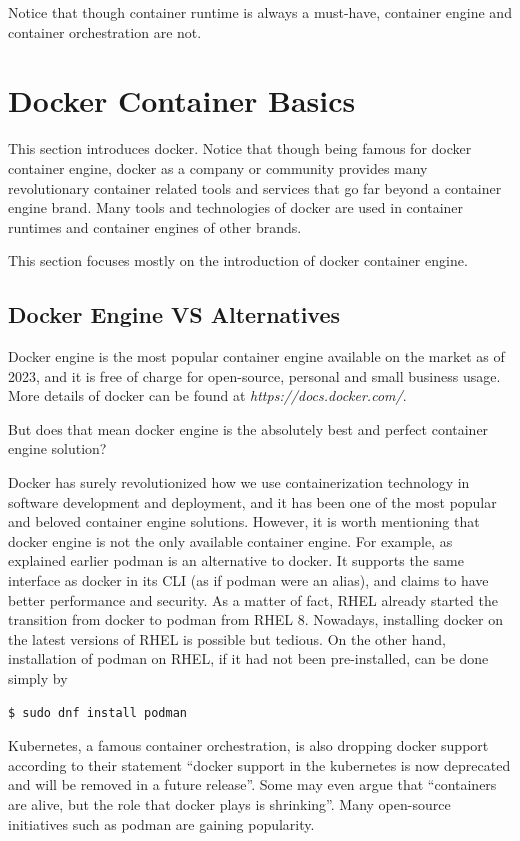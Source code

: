 Notice that though container runtime is always a must-have, container engine and container orchestration are not.

\section{Docker Container Basics} \label{ch:vac:sec:dc}

This section introduces docker. Notice that though being famous for docker container engine, docker as a company or community provides many revolutionary container related tools and services that go far beyond a container engine brand. Many tools and technologies of docker are used in container runtimes and container engines of other brands.

This section focuses mostly on the introduction of docker container engine.

\subsection{Docker Engine VS Alternatives}

Docker engine is the most popular container engine available on the market as of 2023, and it is free of charge for open-source, personal and small business usage. More details of docker can be found at \textit{https://docs.docker.com/}.

But does that mean docker engine is the absolutely best and perfect container engine solution?

Docker has surely revolutionized how we use containerization technology in software development and deployment, and it has been one of the most popular and beloved container engine solutions. However, it is worth mentioning that docker engine is not the only available container engine. For example, as explained earlier podman is an alternative to docker. It supports the same interface as docker in its CLI (as if podman were an alias), and claims to have better performance and security. As a matter of fact, RHEL already started the transition from docker to podman from RHEL 8. Nowadays, installing docker on the latest versions of RHEL is possible but tedious. On the other hand, installation of podman on RHEL, if it had not been pre-installed, can be done simply by
\begin{lstlisting}
$ sudo dnf install podman
\end{lstlisting}
Kubernetes, a famous container orchestration, is also dropping docker support according to their statement ``docker support in the kubernetes is now deprecated and will be removed in a future release''. Some may even argue that ``containers are alive, but the role that docker plays is shrinking''. Many open-source initiatives such as podman are gaining popularity.

